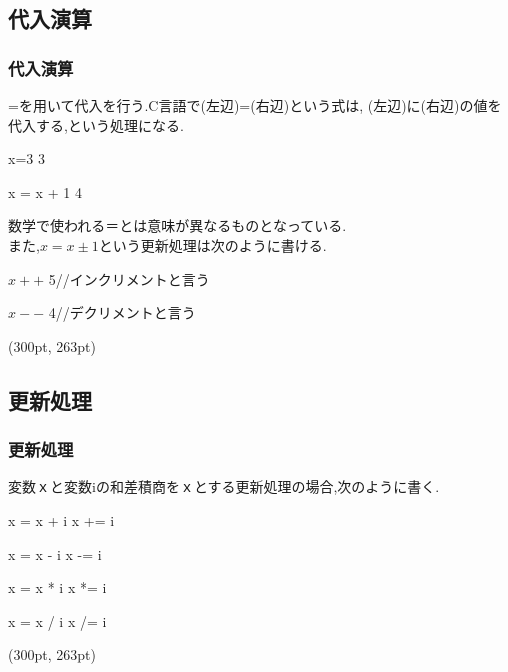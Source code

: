 \documentclass[dvipdfmx]{beamer}
\begin{document}
\subsection{代入演算}
\begin{frame}[t]
    \frametitle{代入演算}
    =を用いて代入を行う.C言語で(左辺)=(右辺)という式は,
    (左辺)に(右辺)の値を代入する,という処理になる.
    \begin{block}{x=3}
        3
    \end{block}
    \begin{block}{x = x + 1}
        4
    \end{block}
    数学で使われる＝とは意味が異なるものとなっている.\\
    また,$x=x\pm 1$という更新処理は次のように書ける.
    \begin{block}{$x++$}
        5\qquad //インクリメントと言う
    \end{block}
    \begin{block}{$x--$}
        4\qquad //デクリメントと言う
    \end{block}
    \begin{textblock*}{0.3\linewidth}(300pt, 263pt)
    \space
    \end{textblock*}
\end{frame}

\subsection{更新処理}
\begin{frame}[t]
    \frametitle{更新処理}
    変数ｘと変数iの和差積商をｘとする更新処理の場合,次のように書く.
    \begin{block}{x = x + i}
        x += i 
    \end{block}
    \begin{block}{x = x - i}
        x -= i
    \end{block}
    \begin{block}{x = x * i}
        x *= i
    \end{block}
    \begin{block}{x = x / i}
        x /= i
    \end{block}
    \begin{textblock*}{0.3\linewidth}(300pt, 263pt)
    \space
    \end{textblock*}
\end{frame}
\end{document}
